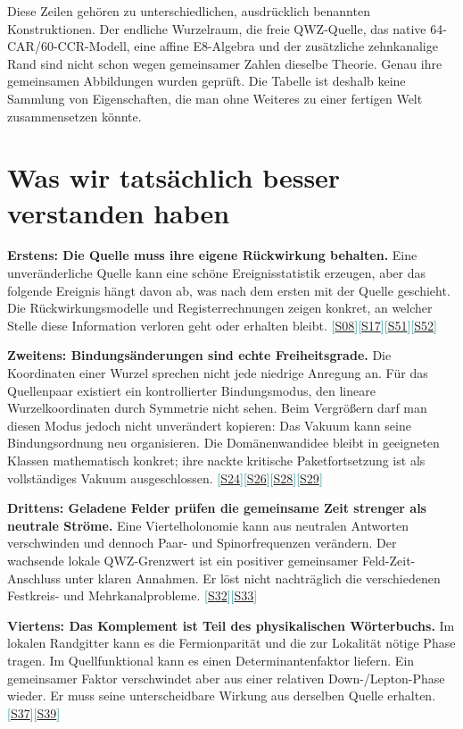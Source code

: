 \documentclass[11pt,a4paper,oneside,parskip=half,headings=normal,numbers=noenddot,bibliography=totoc]{scrreprt}
\newcommand{\src}[1]{\textcolor{teal}{\small[\hyperref[s:#1]{S#1}]}}
\begin{document}
Diese Zeilen gehören zu unterschiedlichen, ausdrücklich benannten Konstruktionen. Der endliche Wurzelraum, die freie QWZ-Quelle, das native 64-CAR/60-CCR-Modell, eine affine E8-Algebra und der zusätzliche zehnkanalige Rand sind nicht schon wegen gemeinsamer Zahlen dieselbe Theorie. Genau ihre gemeinsamen Abbildungen wurden geprüft. Die Tabelle ist deshalb keine Sammlung von Eigenschaften, die man ohne Weiteres zu einer fertigen Welt zusammensetzen könnte.

\section{Was wir tatsächlich besser verstanden haben}
\textbf{Erstens: Die Quelle muss ihre eigene Rückwirkung behalten.} Eine unveränderliche Quelle kann eine schöne Ereignisstatistik erzeugen, aber das folgende Ereignis hängt davon ab, was nach dem ersten mit der Quelle geschieht. Die Rückwirkungsmodelle und Registerrechnungen zeigen konkret, an welcher Stelle diese Information verloren geht oder erhalten bleibt. \src{08}\src{17}\src{51}\src{52}

\textbf{Zweitens: Bindungsänderungen sind echte Freiheitsgrade.} Die Koordinaten einer Wurzel sprechen nicht jede niedrige Anregung an. Für das Quellenpaar existiert ein kontrollierter Bindungsmodus, den lineare Wurzelkoordinaten durch Symmetrie nicht sehen. Beim Vergrößern darf man diesen Modus jedoch nicht unverändert kopieren: Das Vakuum kann seine Bindungsordnung neu organisieren. Die Domänenwandidee bleibt in geeigneten Klassen mathematisch konkret; ihre nackte kritische Paketfortsetzung ist als vollständiges Vakuum ausgeschlossen. \src{24}\src{26}\src{28}\src{29}

\textbf{Drittens: Geladene Felder prüfen die gemeinsame Zeit strenger als neutrale Ströme.} Eine Viertelholonomie kann aus neutralen Antworten verschwinden und dennoch Paar- und Spinorfrequenzen verändern. Der wachsende lokale QWZ-Grenzwert ist ein positiver gemeinsamer Feld-Zeit-Anschluss unter klaren Annahmen. Er löst nicht nachträglich die verschiedenen Festkreis- und Mehrkanalprobleme. \src{32}\src{33}

\textbf{Viertens: Das Komplement ist Teil des physikalischen Wörterbuchs.} Im lokalen Randgitter kann es die Fermionparität und die zur Lokalität nötige Phase tragen. Im Quellfunktional kann es einen Determinantenfaktor liefern. Ein gemeinsamer Faktor verschwindet aber aus einer relativen Down-/Lepton-Phase wieder. Er muss seine unterscheidbare Wirkung aus derselben Quelle erhalten. \src{37}\src{39}
\end{document}
